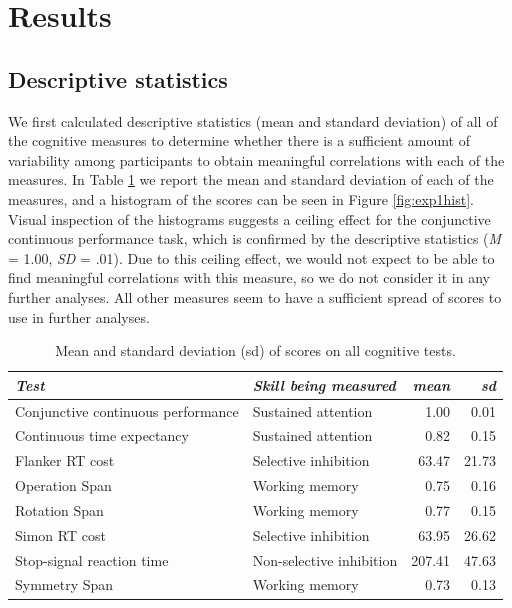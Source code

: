 \documentclass[
  man,floatsintext]{apa6}
\begin{document}
\hypertarget{results}{%
\section{Results}\label{results}}

\hypertarget{descriptive-statistics}{%
\subsection{Descriptive statistics}\label{descriptive-statistics}}

We first calculated descriptive statistics (mean and standard deviation) of all of the cognitive measures to determine whether there is a sufficient amount of variability among participants to obtain meaningful correlations with each of the measures. In Table \ref{tab:cogskillsdesstats} we report the mean and standard deviation of each of the measures, and a histogram of the scores can be seen in Figure \ref{fig:exp1hist}. Visual inspection of the histograms suggests a ceiling effect for the conjunctive continuous performance task, which is confirmed by the descriptive statistics (\emph{M} = 1.00, \emph{SD} = .01). Due to this ceiling effect, we would not expect to be able to find meaningful correlations with this measure, so we do not consider it in any further analyses. All other measures seem to have a sufficient spread of scores to use in further analyses.

\begin{table}

\caption{\label{tab:cogskillsdesstats}Mean and standard deviation (sd) of scores on all cognitive tests.}
\centering
\begin{tabular}[t]{llrr}
\toprule
\em{Test} & \em{Skill being measured} & \em{mean} & \em{sd}\\
\midrule
Conjunctive continuous
 performance & Sustained attention & 1.00 & 0.01\\
Continuous time
 expectancy & Sustained attention & 0.82 & 0.15\\
Flanker RT cost & Selective inhibition & 63.47 & 21.73\\
Operation Span & Working memory & 0.75 & 0.16\\
Rotation Span & Working memory & 0.77 & 0.15\\
\addlinespace
Simon RT cost & Selective inhibition & 63.95 & 26.62\\
Stop-signal reaction time & Non-selective inhibition & 207.41 & 47.63\\
Symmetry Span & Working memory & 0.73 & 0.13\\
\bottomrule
\end{tabular}
\end{table}
\end{document}

